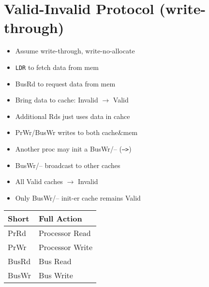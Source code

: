 \section*{Valid-Invalid Protocol (write-through)}
\begin{minipage}{0.4\linewidth}
\end{minipage}
\begin{minipage}{0.6\linewidth}
  \flushleft
  \begin{itemize}
  \item Assume write-through, write-no-allocate
  \item \texttt{LDR} to fetch data from mem
  \item BusRd to request data from mem
  \item Bring data to cache: \textsf{Invalid} $\rightarrow$ \textsf{Valid}
  \item Additional Rds just uses data in cahce
  \item PrWr/BusWr writes to both cache\&mem
  \item Another proc may init a BusWr/-- (\texttt{--->})
  \item BusWr/-- broadcast to other caches
  \item All \textsf{Valid} caches $\rightarrow$ \textsf{Invalid}
  \item Only BusWr/-- init-er cache remains \textsf{Valid}
  \end{itemize}
  \begin{tabular}{l|l}
    \hline
    Short & Full Action \\
    \hline
    PrRd & Processor Read \\
    PrWr & Processor Write \\
    BusRd & Bus Read \\
    BusWr & Bus Write \\
    \hline
  \end{tabular}
\end{minipage}
